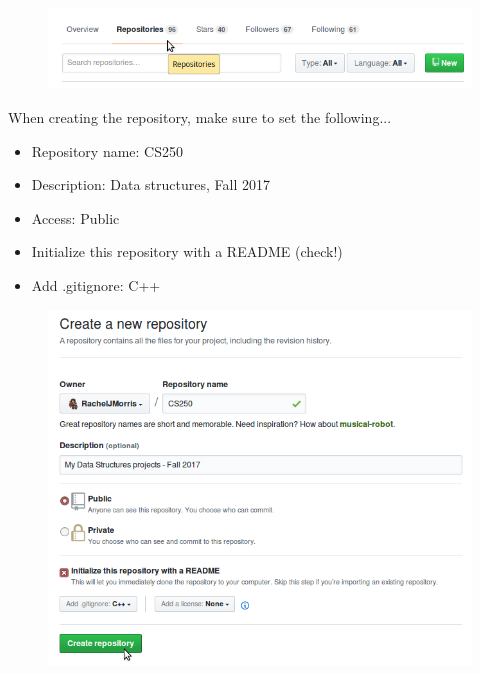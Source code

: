 \documentclass[a4paper,12pt,oneside]{book}
\begin{document}
                \begin{figure}[h]
                    \centering
                    \includegraphics[width=14cm]{images/github-repositories.png}
                \end{figure}

                When creating the repository, make sure to set the following...

                \begin{itemize}
                    \item   Repository name: CS250
                    \item   Description: Data structures, Fall 2017
                    \item   Access: Public
                    \item   Initialize this repository with a README (check!)
                    \item   Add .gitignore: C++
                \end{itemize}

                \newpage

                \begin{figure}[h]
                    \centering
                    \includegraphics[width=14cm]{images/github-newrepo.png}
                \end{figure}
\end{document}
